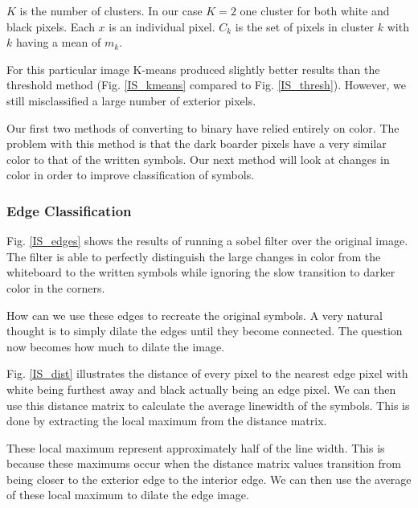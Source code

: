 
$K$ is the number of clusters. In our case $K=2$ one cluster for both white and black pixels. Each $x$ is an individual pixel. $C_k$ is the set of pixels in cluster $k$ with $k$ having a mean of $m_k$.


For this particular image K-means produced slightly better results than the threshold method (Fig. \ref{IS_kmeans} compared to Fig. \ref{IS_thresh}). However, we still misclassified a large number of exterior pixels. 

Our first two methods of converting to binary have relied entirely on color. The problem with this method is that the dark boarder pixels have a very similar color to that of the written symbols. Our next method will look at changes in color in order to improve classification of symbols.

\subsubsection{Edge Classification}

Fig. \ref{IS_edges} shows the results of running a sobel filter over the original image. The filter is able to perfectly distinguish the large changes in color from the whiteboard to the written symbols while ignoring the slow transition to darker color in the corners. 

How can we use these edges to recreate the original symbols. A very natural thought is to simply dilate the edges until they become connected. The question now becomes how much to dilate the image.


Fig. \ref{IS_dist} illustrates the distance of every pixel to the nearest edge pixel with white being furthest away and black actually being an edge pixel. We can then use this distance matrix to calculate the average linewidth of the symbols. This is done by extracting the local maximum from the distance matrix. 


These local maximum represent approximately half of the line width. This is because these maximums occur when the distance matrix values transition from being closer to the exterior edge to the interior edge. We can then use the average of these local maximum to dilate the edge image.  

